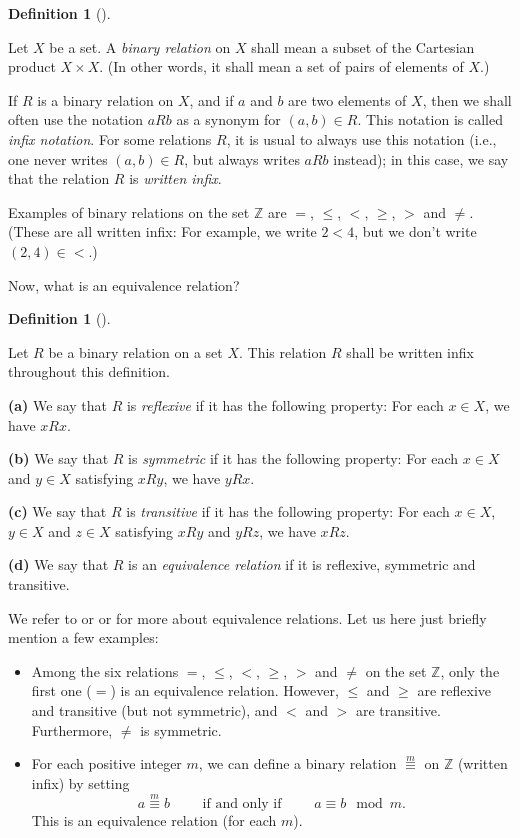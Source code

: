 \documentclass[numbers=enddot,12pt,final,onecolumn,notitlepage]{scrartcl}%
\theoremstyle{definition}
\newtheorem{defi}[theo]{Definition}
\newenvironment{definition}[1][]
{\begin{defi}[#1]\begin{leftbar}}
{\end{leftbar}\end{defi}}
\newcommand{\ZZ}{\mathbb{Z}}
\newcommand{\tup}[1]{\left( #1 \right)}
\begin{document}
\begin{definition} \label{def.intro.relation}
Let $X$ be a set. A \textit{binary relation} on $X$ shall mean a
subset of the Cartesian product $X \times X$. (In other words, it
shall mean a set of pairs of elements of $X$.)

If $R$ is a binary relation on $X$, and if $a$ and $b$ are two
elements of $X$, then we shall often use the notation $a R b$ as a
synonym for $\tup{a, b} \in R$. This notation is called
\textit{infix notation}. For some relations $R$, it is usual to always
use this notation (i.e., one never writes $\tup{a, b} \in R$, but
always writes $a R b$ instead); in this case, we say that the relation
$R$ is \textit{written infix}.
\end{definition}

Examples of binary relations on the set $\ZZ$ are $=$, $\leq$, $<$,
$\geq$, $>$ and $\neq$. (These are all written infix: For example, we
write $2 < 4$, but we don't write $\tup{2, 4} \in <$.)

Now, what is an equivalence relation?

\begin{definition} \label{def.intro.equiv-rel}
Let $R$ be a binary relation on a set $X$. This relation $R$ shall be
written infix throughout this definition.

\textbf{(a)} We say that $R$ is \textit{reflexive} if it has the
following property: For each $x \in X$, we have $x R x$.

\textbf{(b)} We say that $R$ is \textit{symmetric} if it has the
following property: For each $x \in X$ and $y \in X$ satisfying
$x R y$, we have $y R x$.

\textbf{(c)} We say that $R$ is \textit{transitive} if it has the
following property: For each $x \in X$, $y \in X$ and $z \in X$
satisfying $x R y$ and $y R z$, we have $x R z$.

\textbf{(d)} We say that $R$ is an \textit{equivalence relation} if it
is reflexive, symmetric and transitive.
\end{definition}

We refer to \cite[\S 10.10]{LeLeMe16} or \cite[Chapter 9]{Oggier14}
or \cite[\S 3.E]{Day-proofs}
for more about equivalence relations. Let us here just briefly
mention a few examples:
\begin{itemize}
\item Among the six relations $=$, $\leq$, $<$, $\geq$, $>$ and $\neq$
on the set $\ZZ$, only the first one ($=$) is an equivalence relation.
However, $\leq$ and $\geq$ are reflexive and transitive (but not
symmetric), and $<$ and $>$ are transitive. Furthermore, $\neq$ is
symmetric.
\item For each positive integer $m$, we can define a binary relation
$\overset{m}{\equiv}$ on $\ZZ$ (written infix) by setting
\[
a \overset{m}{\equiv} b
\qquad \text{ if and only if } \qquad
a \equiv b \mod m .
\]
This is an equivalence relation (for each $m$).
\end{itemize}
\end{document}
